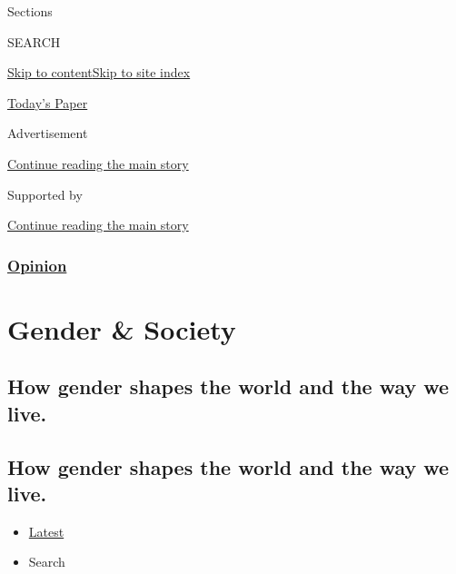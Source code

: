 Sections

SEARCH

\protect\hyperlink{site-content}{Skip to
content}\protect\hyperlink{site-index}{Skip to site index}

\href{https://myaccount.nytimes.com/auth/login?response_type=cookie\&client_id=vi}{}

\href{https://www.nytimes.com/section/todayspaper}{Today's Paper}

Advertisement

\protect\hyperlink{after-top}{Continue reading the main story}

Supported by

\protect\hyperlink{after-sponsor}{Continue reading the main story}

\hypertarget{opinion}{%
\subsubsection{\texorpdfstring{\href{/section/opinion}{Opinion}}{Opinion}}\label{opinion}}

\hypertarget{gender--society}{%
\section{Gender \& Society}\label{gender--society}}

\hypertarget{how-gender-shapes-the-world-and-the-way-we-live}{%
\subsection{How gender shapes the world and the way we
live.}\label{how-gender-shapes-the-world-and-the-way-we-live}}

\hypertarget{how-gender-shapes-the-world-and-the-way-we-live-1}{%
\subsection{How gender shapes the world and the way we
live.}\label{how-gender-shapes-the-world-and-the-way-we-live-1}}

\begin{itemize}
\tightlist
\item
  \protect\hyperlink{stream-panel}{Latest}
\item
  Search
\end{itemize}

